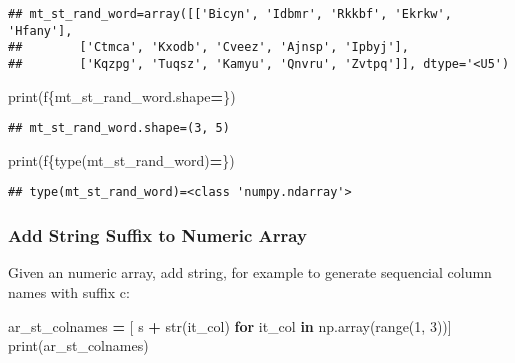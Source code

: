 \documentclass[
]{book}
\newenvironment{Shaded}{\begin{snugshade}}{\end{snugshade}}
\newcommand{\BuiltInTok}[1]{#1}
\newcommand{\ControlFlowTok}[1]{\textcolor[rgb]{0.13,0.29,0.53}{\textbf{#1}}}
\newcommand{\DecValTok}[1]{\textcolor[rgb]{0.00,0.00,0.81}{#1}}
\newcommand{\KeywordTok}[1]{\textcolor[rgb]{0.13,0.29,0.53}{\textbf{#1}}}
\newcommand{\NormalTok}[1]{#1}
\newcommand{\OperatorTok}[1]{\textcolor[rgb]{0.81,0.36,0.00}{\textbf{#1}}}
\newcommand{\SpecialCharTok}[1]{\textcolor[rgb]{0.00,0.00,0.00}{#1}}
\newcommand{\SpecialStringTok}[1]{\textcolor[rgb]{0.31,0.60,0.02}{#1}}
\newcommand{\StringTok}[1]{\textcolor[rgb]{0.31,0.60,0.02}{#1}}
\begin{document}
\begin{verbatim}
## mt_st_rand_word=array([['Bicyn', 'Idbmr', 'Rkkbf', 'Ekrkw', 'Hfany'],
##        ['Ctmca', 'Kxodb', 'Cveez', 'Ajnsp', 'Ipbyj'],
##        ['Kqzpg', 'Tuqsz', 'Kamyu', 'Qnvru', 'Zvtpq']], dtype='<U5')
\end{verbatim}

\begin{Shaded}
\begin{Highlighting}[]
\BuiltInTok{print}\NormalTok{(}\SpecialStringTok{f\textquotesingle{}}\SpecialCharTok{\{}\NormalTok{mt\_st\_rand\_word}\SpecialCharTok{.}\NormalTok{shape}\OperatorTok{=}\SpecialCharTok{\}}\SpecialStringTok{\textquotesingle{}}\NormalTok{)}
\end{Highlighting}
\end{Shaded}

\begin{verbatim}
## mt_st_rand_word.shape=(3, 5)
\end{verbatim}

\begin{Shaded}
\begin{Highlighting}[]
\BuiltInTok{print}\NormalTok{(}\SpecialStringTok{f\textquotesingle{}}\SpecialCharTok{\{}\BuiltInTok{type}\NormalTok{(mt\_st\_rand\_word)}\OperatorTok{=}\SpecialCharTok{\}}\SpecialStringTok{\textquotesingle{}}\NormalTok{)}
\end{Highlighting}
\end{Shaded}

\begin{verbatim}
## type(mt_st_rand_word)=<class 'numpy.ndarray'>
\end{verbatim}

\hypertarget{add-string-suffix-to-numeric-array}{%
\subsubsection{Add String Suffix to Numeric Array}\label{add-string-suffix-to-numeric-array}}

Given an numeric array, add string, for example to generate sequencial column names with suffix c:

\begin{Shaded}
\begin{Highlighting}[]
\NormalTok{ar\_st\_colnames }\OperatorTok{=}\NormalTok{ [ }\StringTok{\textquotesingle{}s\textquotesingle{}} \OperatorTok{+} \BuiltInTok{str}\NormalTok{(it\_col) }\ControlFlowTok{for}\NormalTok{ it\_col }\KeywordTok{in}\NormalTok{ np.array(}\BuiltInTok{range}\NormalTok{(}\DecValTok{1}\NormalTok{, }\DecValTok{3}\NormalTok{))]}
\BuiltInTok{print}\NormalTok{(ar\_st\_colnames)}
\end{Highlighting}
\end{Shaded}
\end{document}
